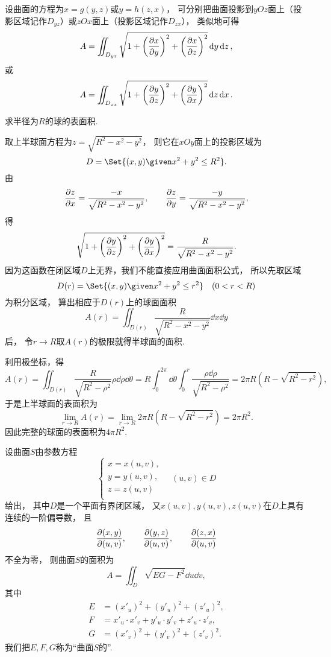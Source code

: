 设曲面的方程为\(x=g(y,z)\)或\(y=h(z,x)\)，
可分别把曲面投影到\(yOz\)面上（投影区域记作\(D_{yz}\)）或\(zOx\)面上（投影区域记作\(D_{zx}\)），
类似地可得\begin{equation}
	A = \iint_{D_{yz}} \sqrt{1 + \left(\pdv{x}{y}\right)^2 + \left(\pdv{x}{z}\right)^2} \dd{y}\dd{z},
\end{equation}或\begin{equation}
	A = \iint_{D_{zx}} \sqrt{1 + \left(\pdv{y}{z}\right)^2 + \left(\pdv{y}{x}\right)^2} \dd{z}\dd{x}.
\end{equation}

\begin{example}
求半径为\(R\)的球的表面积.
\begin{solution}
取上半球面方程为\(z = \sqrt{R^2-x^2-y^2}\)，
则它在\(xOy\)面上的投影区域为\[
	D = \Set{(x,y) \given x^2+y^2 \leq R^2}.
\]
由\[
	\pdv{z}{x} = \frac{-x}{\sqrt{R^2-x^2-y^2}},
	\qquad
	\pdv{z}{y} = \frac{-y}{\sqrt{R^2-x^2-y^2}},
\]
得\[
	\sqrt{1 + \left(\pdv{y}{z}\right)^2 + \left(\pdv{y}{x}\right)^2}
	= \frac{R}{\sqrt{R^2-x^2-y^2}}.
\]
因为这函数在闭区域\(D\)上无界，我们不能直接应用曲面面积公式，
所以先取区域\[
	D(r) = \Set{(x,y) \given x^2+y^2 \leq r^2}
	\quad(0<r<R)
\]为积分区域，
算出相应于\(D(r)\)上的球面面积\[
	A(r) = \iint_{D(r)} \frac{R}{\sqrt{R^2-x^2-y^2}} \dd{x}\dd{y}
\]后，
令\(r \to R\)取\(A(r)\)的极限就得半球面的面积.

利用极坐标，得\[
	A(r) = \iint_{D(r)} \frac{R}{\sqrt{R^2-\rho^2}} \rho\dd{\rho}\dd{\theta}
	= R \int_0^{2\pi} \dd{\theta} \int_0^r \frac{\rho \dd{\rho}}{\sqrt{R^2-\rho^2}}
	= 2\pi R(R-\sqrt{R^2-r^2}),
\]
于是上半球面的表面积为\[
	\lim_{r \to R} A(r)
	= \lim_{r \to R} 2\pi R(R-\sqrt{R^2-r^2})
	= 2\pi R^2.
\]
因此完整的球面的表面积为\(4\pi R^2\).
\end{solution}
\end{example}

\begin{theorem}[利用曲面的参数方程求曲面的面积]
设曲面\(S\)由参数方程\[
	\left\{ \begin{array}{l}
		x = x(u,v), \\
		y = y(u,v), \\
		z = z(u,v) \\
	\end{array} \right.
	\quad
	(u,v) \in D
\]给出，
其中\(D\)是一个平面有界闭区域，
又\(x(u,v), y(u,v), z(u,v)\)在\(D\)上具有连续的一阶偏导数，
且\[
	\pdv{ (x,y) }{ (u,v) }, \qquad
	\pdv{ (y,z) }{ (u,v) }, \qquad
	\pdv{ (z,x) }{ (u,v) }
\]不全为零，
则曲面\(S\)的面积为
\begin{equation}\label{equation:重积分.曲面的面积计算公式}
	A = \iint_D \sqrt{E G - F^2} \dd{u}\dd{v},
\end{equation}
其中\begin{align*}
	E &= (x'_u)^2 + (y'_u)^2 + (z'_u)^2, \\
	F &= x'_u \cdot x'_v + y'_u \cdot y'_v + z'_u \cdot z'_v, \\
	G &= (x'_v)^2 + (y'_v)^2 + (z'_v)^2.
\end{align*}
\rm
我们把\(E,F,G\)称为“曲面\(S\)的”.
\end{theorem}


